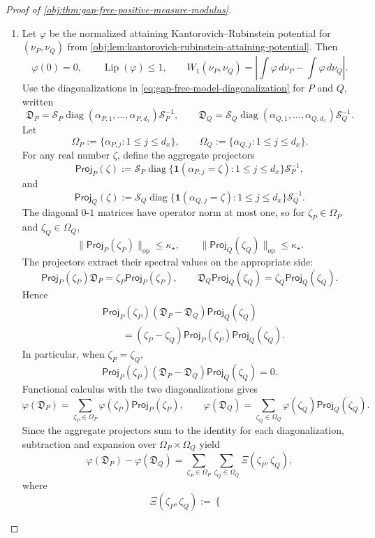 \documentclass[11pt]{article}
\begin{document}
\begin{proof}[Proof of \cref{obj:thm:gap-free-positive-measure-modulus}]
\begin{enumerate}
\item Let \(\varphi\) be the normalized attaining Kantorovich--Rubinstein potential for
\((\nu_P,\nu_Q)\) from \cref{obj:lem:kantorovich-rubinstein-attaining-potential}.  Then
\[
\varphi(0)=0,
\qquad
\operatorname{Lip}(\varphi)\le1,
\qquad
W_1(\nu_P,\nu_Q)
=
\left|
\int\varphi\,d\nu_P-\int\varphi\,d\nu_Q
\right|.
\]
Use the diagonalizations in \cref{eq:gap-free-model-diagonalization} for \(P\) and \(Q\), written
\[
\mathfrak D_P
=
\mathcal S_P\operatorname{diag}(\alpha_{P,1},\ldots,\alpha_{P,d_x})\mathcal S_P^{-1},
\qquad
\mathfrak D_Q
=
\mathcal S_Q\operatorname{diag}(\alpha_{Q,1},\ldots,\alpha_{Q,d_x})\mathcal S_Q^{-1}.
\]
Let
\[
\Omega_P:=\{\alpha_{P,j}:1\le j\le d_x\},
\qquad
\Omega_Q:=\{\alpha_{Q,j}:1\le j\le d_x\}.
\]
For any real number \(\zeta\), define the aggregate projectors
\[
\mathsf{Proj}_P(\zeta)
:=
\mathcal S_P\operatorname{diag}\{\mathbf 1(\alpha_{P,j}=\zeta):1\le j\le d_x\}\mathcal S_P^{-1},
\]
and
\[
\mathsf{Proj}_Q(\zeta)
:=
\mathcal S_Q\operatorname{diag}\{\mathbf 1(\alpha_{Q,j}=\zeta):1\le j\le d_x\}\mathcal S_Q^{-1}.
\]
The diagonal \(0\)-\(1\) matrices have operator norm at most one, so for
\(\zeta_P\in\Omega_P\) and \(\zeta_Q\in\Omega_Q\),
\[
\|\mathsf{Proj}_P(\zeta_P)\|_{\mathrm{op}}\le\kappa_\star,
\qquad
\|\mathsf{Proj}_Q(\zeta_Q)\|_{\mathrm{op}}\le\kappa_\star.
\]
The projectors extract their spectral values on the appropriate side:
\[
\mathsf{Proj}_P(\zeta_P)\mathfrak D_P
=
\zeta_P\mathsf{Proj}_P(\zeta_P),
\qquad
\mathfrak D_Q\mathsf{Proj}_Q(\zeta_Q)
=
\zeta_Q\mathsf{Proj}_Q(\zeta_Q).
\]
Hence
\[
\begin{aligned}
&\mathsf{Proj}_P(\zeta_P)(\mathfrak D_P-\mathfrak D_Q)\mathsf{Proj}_Q(\zeta_Q)\\
&\qquad=
(\zeta_P-\zeta_Q)\mathsf{Proj}_P(\zeta_P)\mathsf{Proj}_Q(\zeta_Q).
\end{aligned}
\]
In particular, when \(\zeta_P=\zeta_Q\),
\[
\mathsf{Proj}_P(\zeta_P)(\mathfrak D_P-\mathfrak D_Q)\mathsf{Proj}_Q(\zeta_Q)=0.
\]
Functional calculus with the two diagonalizations gives
\[
\varphi(\mathfrak D_P)
=
\sum_{\zeta_P\in\Omega_P}\varphi(\zeta_P)\mathsf{Proj}_P(\zeta_P),
\qquad
\varphi(\mathfrak D_Q)
=
\sum_{\zeta_Q\in\Omega_Q}\varphi(\zeta_Q)\mathsf{Proj}_Q(\zeta_Q).
\]
Since the aggregate projectors sum to the identity for each diagonalization, subtraction and expansion over
\(\Omega_P\times\Omega_Q\) yield
\[
\varphi(\mathfrak D_P)-\varphi(\mathfrak D_Q)
=
\sum_{\zeta_P\in\Omega_P}\sum_{\zeta_Q\in\Omega_Q}
\Xi(\zeta_P,\zeta_Q),
\]
where
\[
\Xi(\zeta_P,\zeta_Q)
:=
\begin{cases}

\end{cases}\]
\end{enumerate}
\end{proof}
\end{document}
